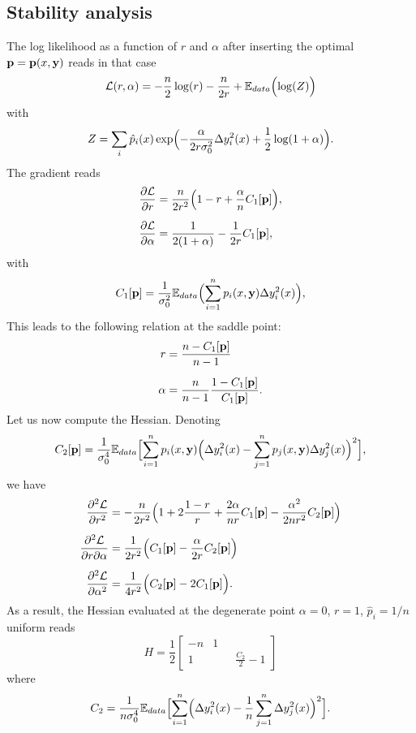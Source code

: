 \documentclass[envcountsect,runningheads]{llncs}
\theoremstyle{etoile}
\def\DD{\displaystyle}
\begin{document}
\begin{appendix}
\section{Stability analysis}\label{app:Hessian}
The log likelihood as a function of $r$ and $\alpha$ after inserting the optimal
${\bf p} = {\bf p}(x,{\bf y})$ reads in that case
\[
{\cal L}(r,\alpha) = -\frac{n}{2}\log(r)-\frac{n}{2r}+{\mathbb E}_{data}\Bigl(\log(Z)\Bigr)
\]
with
\[
Z = \sum_i \hat p_i(x)\exp\Bigl(-\frac{\alpha}{2r\sigma_0^2}\Delta y_i^2(x)+\frac{1}{2}\log(1+\alpha)\Bigr).
\]
The gradient reads
\begin{align*}
  \frac{\partial {\cal L}}{\partial r} &= \frac{n}{2r^2}\Bigl(1-r+\frac{\alpha}{n}C_1[{\bf p}]\Bigr),\\[0.2cm]
  \frac{\partial {\cal L}}{\partial \alpha} &= \frac{1}{2(1+\alpha)}-\frac{1}{2r}C_1[{\bf p}],  
\end{align*}
with
\[
C_1[{\bf p}] = \frac{1}{\sigma_0^2}{\mathbb E}_{data}\Bigl(\sum_{i=1}^n p_i(x,{\bf y})\Delta y_i^2(x)\Bigr),
\]
This leads to the following relation at the saddle point:
\begin{align*}
  r &= \frac{n-C_1[{\bf p}]}{n-1}\\[0.2cm]
\alpha &= \frac{n}{n-1}\frac{1-C_1[{\bf p}]}{C_1[{\bf p}]}.
\end{align*}
Let us now compute the Hessian. Denoting
\[
C_2[{\bf p}] = \frac{1}{\sigma_0^4}{\mathbb E}_{data}\Bigl[\sum_{i=1}^n p_i(x,{\bf y})\Bigl(\Delta y_i^2(x)-\sum_{j=1}^np_j(x,{\bf y})\Delta y_j^2(x)\Bigr)^2\Bigr],
\]
we have
\begin{align*}
\frac{\partial^2 {\cal L}}{\partial r^2} &= -\frac{n}{2r^2}\Bigl(1+2\frac{1-r}{r}+\frac{2\alpha}{nr}C_1[{\bf p}]-\frac{\alpha^2}{2nr^2}C_2[{\bf p}]\Bigr)\\[0.2cm]
\frac{\partial^2 {\cal L}}{\partial r\partial \alpha} &=\frac{1}{2r^2}\Bigl(C_1[{\bf p}]-\frac{\alpha}{2r}C_2[{\bf p}]\Bigr)\\[0.2cm]
\frac{\partial^2 {\cal L}}{\partial \alpha^2} &= \frac{1}{4r^2}\Bigl(C_2[{\bf p}]-2C_1[{\bf p}]\Bigr). 
\end{align*}
As a result, the Hessian evaluated at the degenerate point $\alpha=0$, $r=1$, $\hat  p_i=1/n$ uniform reads
\[
H =\frac{1}{2}
\left[
  \begin{matrix}
 -n & 1\\[0.4cm] 
 1 & \qquad\DD \frac{C_2}{2}-1
  \end{matrix}
  \right]
\]
where
\[
C_2 = \frac{1}{n\sigma_0^4}{\mathbb E}_{data}\Bigl[\sum_{i=1}^n \Bigl(\Delta y_i^2(x)-\frac{1}{n}\sum_{j=1}^n\Delta y_j^2(x)\Bigr)^2\Bigr].
\]


\end{appendix}
\end{document}
